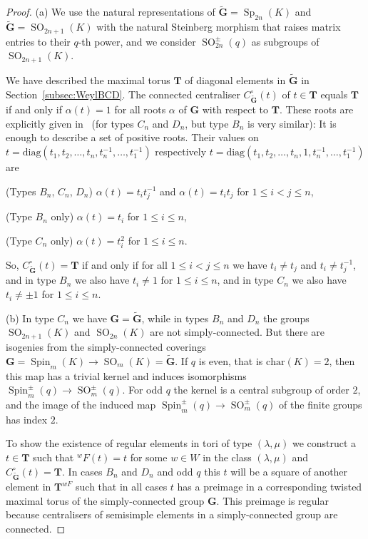 \documentclass{ert-l}
\newcommand{\bG}{{\mathbf{G}}}
\newcommand{\bT}{{\mathbf{T}}}
\newcommand{\Sp}{{\operatorname{Sp}}}
\newcommand{\Spin}{{\operatorname{Spin}}}
\newcommand{\SO}{{\operatorname{SO}}}
\let\la=\lambda
\theoremstyle{definition}
\theoremstyle{remark}
\begin{document}
\begin{proof}
(a) We use the natural representations of $\tilde\bG = \Sp_{2n}(K)$ and
$\tilde\bG = \SO_{2n+1}(K)$ with the natural Steinberg morphism that raises
matrix entries to their $q$-th power, and we consider $\SO_{2n}^\pm(q)$ as
subgroups of $\SO_{2n+1}(K)$.

We have described the maximal torus $\bT$ of diagonal elements in
$\tilde\bG$ in Section~\ref{subsec:WeylBCD}.
The connected centraliser $C_{\tilde\bG}^\circ(t)$ of $t\in\bT$ equals $\bT$
if and only if $\alpha(t) = 1$ for all roots $\alpha$ of $\bG$ with respect
to $\bT$. These roots are explicitly given in~\cite[Chap. 15]{DM} (for
types $C_n$ and $D_n$, but type $B_n$ is very similar): It is enough to
describe a set of positive roots. Their values on $t = \textrm{diag}(t_1,
t_2, \ldots, t_n, t_n^{-1}, \ldots, t_1^{-1})$ respectively
$t = \textrm{diag}(t_1, t_2, \ldots, t_n, 1, t_n^{-1}, \ldots, t_1^{-1})$ are

(Types $B_n$, $C_n$, $D_n$) $\alpha(t) = t_i t_j^{-1}$ and $\alpha(t) = t_i
t_j$ for $1\leq i < j \leq n$,

(Type $B_n$ only) $\alpha(t) = t_i$ for $1\leq i \leq n$,

(Type $C_n$ only) $\alpha(t) = t_i^2$ for $1\leq i \leq n$.

So, $C_{\tilde\bG}^\circ(t) = \bT$ if and only if for all $1 \leq i < j \leq n$
we have $t_i \neq t_j$ and $t_i \neq t_j^{-1}$, and in type $B_n$ we also
have $t_i \neq 1$ for $1 \leq i \leq n$, and in type $C_n$ we also have
$t_i \neq \pm 1$ for $1 \leq i \leq n$.

(b) In type $C_n$ we have $\bG = \tilde \bG$, while in types $B_n$ and $D_n$
the groups $\SO_{2n+1}(K)$ and $\SO_{2n}(K)$ are not simply-connected. But
there are isogenies from the simply-connected
coverings $\bG = \Spin_m(K) \to \SO_m(K) = \tilde\bG$. If $q$ is even, that
is $\textrm{char}(K) = 2$, then this map has a trivial kernel and induces
isomorphisms $\Spin^\pm_m(q) \to \SO_m^\pm(q)$. For odd $q$ the kernel is a
central subgroup of order $2$, and the image of the induced
map $\Spin^\pm_m(q) \to \SO_m^\pm(q)$ of the finite groups has index $2$.

To show the existence of regular elements in tori of type $(\la, \mu)$ we
construct a $t \in \bT$ such that $^wF(t) = t$ for some $w\in W$ in the class
$(\la,\mu)$ and $C_{\tilde\bG}^\circ(t) = \bT$. In cases $B_n$ and $D_n$ and odd
$q$ this $t$ will be a square of another element in $\bT^{wF}$ such that in
all cases $t$ has a preimage in a corresponding twisted maximal torus of the
simply-connected group $\bG$.  This preimage is regular because centralisers
of semisimple elements in a simply-connected group are connected.


\end{proof}
\end{document}

